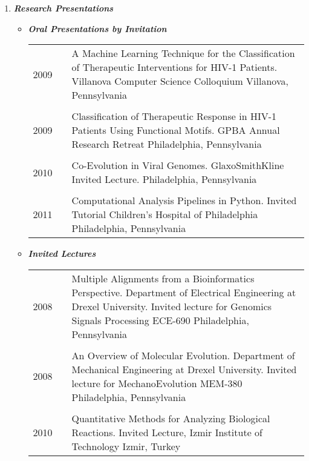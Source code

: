 \documentclass[a4paper,11pt]{article}
\begin{document}
\begin{enumerate}
\begin{itemize}
 \end{itemize}

 \item {\LARGE \itshape \bfseries Research Presentations}
 \begin{itemize}
  \item[] {\Large \bfseries \itshape Oral Presentations by Invitation}
   \begin{longtable}{p{}p{}p{}}
  2009 & & A Machine Learning Technique for the Classification of Therapeutic Interventions for HIV-1 Patients. \newline Villanova Computer Science Colloquium \newline Villanova, Pennsylvania \\
  \\
  2009 & & Classification of Therapeutic Response in HIV-1 Patients Using Functional Motifs. \newline GPBA Annual Research Retreat \newline Philadelphia, Pennsylvania \\
  \\
  2010 & & Co-Evolution in Viral Genomes. \newline GlaxoSmithKline Invited Lecture. \newline 	Philadelphia, Pennsylvania \\
  \\
  2011 & & Computational Analysis Pipelines in Python. \newline Invited Tutorial Children’s Hospital of Philadelphia \newline Philadelphia, Pennsylvania \\
  \end{longtable}
  \item[] {\Large \bfseries \itshape Invited Lectures}
   \begin{longtable}{p{}p{}p{}}
   2008 & & Multiple Alignments from a Bioinformatics Perspective. \newline Department of Electrical Engineering at Drexel University. \newline Invited lecture for Genomics Signals Processing ECE-690 \newline 	Philadelphia, Pennsylvania \\
   \\
   2008 & & An Overview of Molecular Evolution. \newline Department of Mechanical Engineering at Drexel University. \newline Invited lecture for MechanoEvolution MEM-380 \newline Philadelphia, Pennsylvania \\
   \\
   2010 & & Quantitative Methods for Analyzing Biological Reactions. \newline Invited Lecture, Izmir Institute of Technology \newline Izmir, Turkey \\
  \end{longtable}
 \end{itemize} 
\end{enumerate}
\pagestyle{otherpages}
\end{document}
